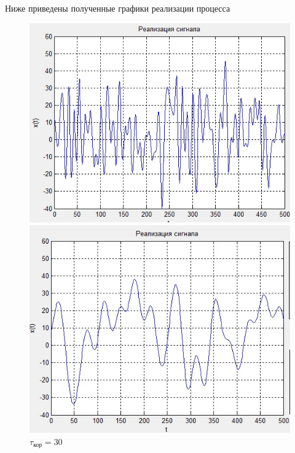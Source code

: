  Ниже приведены полученные графики реализации процесса
 \begin{figure}[H]
 	\begin{minipage}{0.3\linewidth}
 		\centering
 		\includegraphics[width=\linewidth]{tasks/task1/realize10}
 		\caption*{$\tau_\text{кор}=10$}
 	\end{minipage}
 \begin{minipage}{0.3\linewidth}
 	\centering
 	\includegraphics[width=\linewidth]{tasks/task1/realize30}
 	\caption*{$\tau_\text{кор}=30$}
 \end{minipage}
\begin{minipage}{0.3\linewidth}
	\centering

\end{minipage}
\end{figure}
